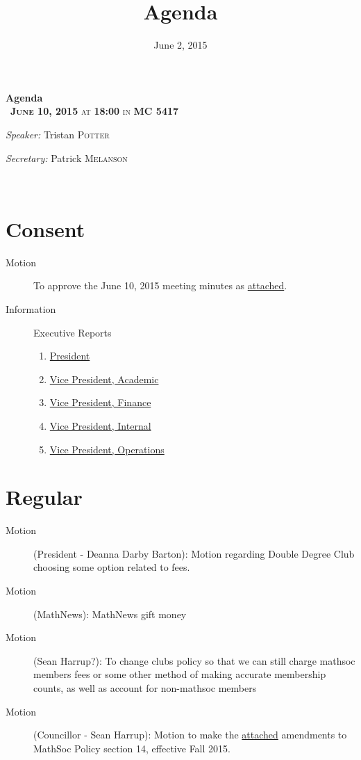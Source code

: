 \documentclass[12pt, letterpaper]{article}
\title{Agenda}
\date{June 2, 2015}
\newcommand{\meetingDate}{June 10, 2015}
\newcommand{\meetingTime}{18:00}
\newcommand{\meetingLocation}{MC 5417}
\begin{document}
\hypersetup{} %


\begin{center}
{ \huge \bfseries Agenda \\[0.4cm] }
{\textsc{~\textbf{\meetingDate} at \textbf{\meetingTime} in \textbf{\meetingLocation}}}
\\[0.2cm]

\begin{minipage}[t]{0.5\textwidth}
\begin{flushleft} \large
\emph{Speaker:}
Tristan \textsc{Potter}
\end{flushleft}
\end{minipage}%
\begin{minipage}[t]{0.5\textwidth}
\begin{flushright} \large
\emph{Secretary:} 
Patrick \textsc{Melanson}
\end{flushright}
\end{minipage}

\HRule \\[0.4cm]
\end{center}

\section*{Consent}
\begin{description}
	\item[Motion] To approve the June 10, 2015 meeting minutes as \hyperref[minutes]{attached}.
	\item[Information] Executive Reports
	\begin{enumerate}
		\item \hyperref[president]{President}
		\item \hyperref[vpacademic]{Vice President, Academic}
		\item \hyperref[vpfinance]{Vice President, Finance}
		\item \hyperref[vpinternal]{Vice President, Internal}
		\item \hyperref[vpoperations]{Vice President, Operations}
	\end{enumerate}
\end{description}
\HRule
\section*{Regular}
\begin{description}
	\item[Motion] (President - Deanna Darby Barton): Motion regarding Double Degree Club choosing some option related to fees.
	\item[Motion] (MathNews): MathNews gift money
	\item[Motion] (Sean Harrup?): To change clubs policy so that we can still charge mathsoc members fees or some other method of making accurate membership counts, as well as account for non-mathsoc members
	\item[Motion] (Councillor - Sean Harrup): Motion to make the \hyperref[cif]{attached} amendments to MathSoc Policy section 14, effective Fall 2015.
\end{description}
\end{document}
